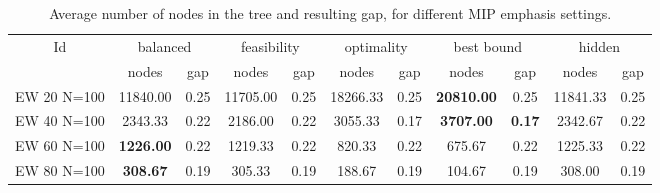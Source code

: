 \begin{sidewaystable}[h]
\label{table:bnc:emph}
\centering

\begin{tabular}{|c|cc|cc|cc|cc|cc|}
\hline
\multicolumn{1}{|c|}{Id} & \multicolumn{2}{|c|}{balanced} & \multicolumn{2}{|c|}{feasibility} & \multicolumn{2}{|c|}{optimality} & \multicolumn{2}{|c|}{best bound} & \multicolumn{2}{|c|}{hidden}
\\
 & nodes & gap & nodes & gap & nodes & gap & nodes & gap & nodes & gap
\\
\hline
EW 20 N=100 & 11840.00 & 0.25 & 11705.00 & 0.25 & 18266.33 & 0.25 & \textbf{20810.00} & 0.25 & 11841.33 & 0.25
\\
EW 40 N=100 & 2343.33 & 0.22 & 2186.00 & 0.22 & 3055.33 & 0.17 & \textbf{3707.00} & \textbf{0.17} & 2342.67 & 0.22
\\
EW 60 N=100 & \textbf{1226.00} & 0.22 & 1219.33 & 0.22 & 820.33 & 0.22 & 675.67 & 0.22 & 1225.33 & 0.22
\\
EW 80 N=100 & \textbf{308.67} & 0.19 & 305.33 & 0.19 & 188.67 & 0.19 & 104.67 & 0.19 & 308.00 & 0.19
\\
\hline 
\end{tabular}

 
\caption{Average number of nodes in the tree and resulting gap, for different MIP emphasis settings.}

\end{sidewaystable}

\clearpage

